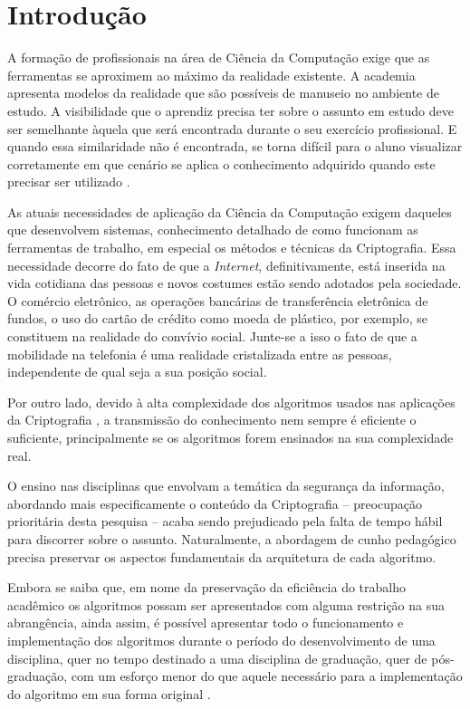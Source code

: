 \chapter{Introdução}
\label{char:intro}
A formação de profissionais na área de Ciência da Computação exige que as ferramentas se aproximem ao máximo da realidade existente. A academia apresenta modelos da realidade que são possíveis de manuseio no ambiente de estudo. A visibilidade que o aprendiz precisa ter sobre o assunto em estudo deve ser semelhante àquela que será encontrada durante o seu exercício profissional. E quando essa similaridade não é encontrada, se torna difícil para o aluno visualizar corretamente em que cenário se aplica o conhecimento adquirido quando este precisar ser utilizado \cite{maia01} \cite{maia03} \cite{kioki08} \cite{silva09}.

As atuais necessidades de aplicação da Ciência da Computação exigem daqueles que desenvolvem sistemas, conhecimento detalhado de como funcionam as ferramentas de trabalho, em especial os métodos e técnicas da Criptografia. Essa necessidade decorre do fato de que a \textit{Internet}, definitivamente, está inserida na vida cotidiana das pessoas e novos costumes estão sendo adotados pela sociedade. O comércio eletrônico, as operações bancárias de transferência eletrônica de fundos, o uso do cartão de crédito como moeda de plástico, por exemplo, se constituem na realidade do convívio social. Junte-se a isso o fato de que a mobilidade na telefonia é uma realidade cristalizada entre as pessoas, independente de qual seja a sua posição social.

Por outro lado, devido à alta complexidade dos algoritmos usados nas aplicações da Criptografia \cite{silva09} \cite{silva12}, a transmissão do conhecimento nem sempre é eficiente o suficiente, principalmente se os algoritmos forem ensinados na sua complexidade real. 

O ensino nas disciplinas que envolvam a temática da segurança da informação, abordando mais especificamente o conteúdo da Criptografia – preocupação prioritária desta pesquisa – acaba sendo prejudicado pela falta de tempo hábil para discorrer sobre o assunto. Naturalmente, a abordagem de cunho pedagógico precisa preservar os aspectos fundamentais da arquitetura de cada algoritmo. \cite{silva09} \cite{garmpis11} \cite{lopes12}

Embora se saiba que, em nome da preservação da eficiência do trabalho acadêmico os algoritmos possam ser apresentados com alguma restrição na sua abrangência, ainda assim, é possível apresentar todo o funcionamento e implementação dos algoritmos durante o período do desenvolvimento de uma disciplina, quer no tempo destinado a uma disciplina de graduação, quer de pós-graduação, com um esforço menor do que aquele necessário para a implementação do algoritmo em sua forma original \cite{maia01} \cite{maia03} \cite{stallings10}.


